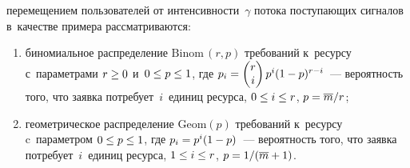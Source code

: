 \begin{multicols}{2}
  \begin{figure*} %
    \vspace*{1pt}
    \begin{minipage}[t]{80mm}
\begin{center}
\mbox{%
\epsfxsize=77.795mm
}
\end{center}
\vspace*{-9pt}
\end{minipage}
\hfill
 \vspace*{1pt}
     \begin{minipage}[t]{80mm}
\begin{center}
\mbox{%
\epsfxsize=77.795mm
}
\end{center}
\vspace*{-9pt}
\end{minipage}
\end{figure*}

\pagebreak

\noindent
перемещением пользователей от интенсивности~$\gamma$ потока 
поступающих сигналов в~качестве примера рассматриваются: 
  \begin{enumerate}[(1)]
\item биномиальное распределение $\mathrm{Binom}\,(r,p)$ требований к~ресурсу 
с~параметрами $r\hm\geq0$ и~$0\hm\leq p\hm\leq 1$, где $p_i\hm= 
\begin{pmatrix} r\\ i\end{pmatrix} p^i(1-p)^{r-i}$~--- вероятность того, что 
заявка потребует~$i$~единиц ресурса, $0\hm\leq i\hm\leq r$, $p\hm= 
\overline{m}/r$; 
\item геометрическое распределение $\mathrm{Geom}(p)$ требований к~ресурсу 
c~параметром $0\hm\leq p\hm\leq 1$, где $p_i\hm= p^i(1-p)$~--- вероятность 
того, что заявка потребует~$i$~единиц ресурса, $1\hm\leq i\hm\leq r$, 
$p\hm=1/(\overline{m}+1)$.
\end{enumerate}
  

\end{multicols}
